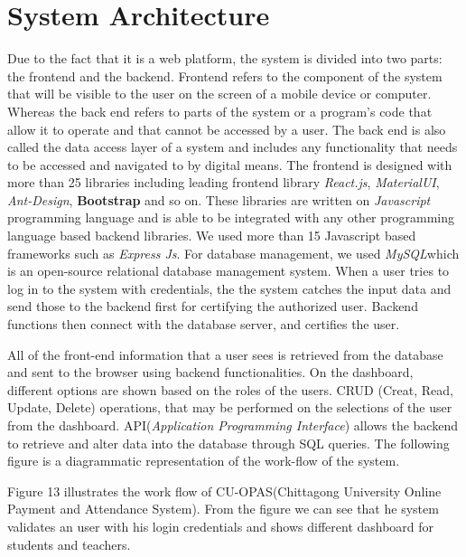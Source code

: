 \section{System Architecture}\label{sec:sa}
Due to the fact that it is a web platform, the system is divided into two parts: the frontend and the backend. Frontend refers to the component of the system that will be visible to the user on the screen of a mobile device or computer. Whereas the back end refers to parts of the system or a program's code that allow it to operate and that cannot be accessed by a user. The back end is also called the data access layer of a system and includes any functionality that needs to be accessed and navigated to by digital means. The frontend is designed with more than 25 libraries including leading frontend library \textit{React.js}, \textit{MaterialUI}, \textit{Ant-Design}, \textbf{Bootstrap} and so on. These libraries are written on \textit{Javascript} programming language and is able to be integrated with any other programming language based backend libraries. We used more than 15 Javascript based frameworks such as \textit{Express Js}. For database management, we used \textit{MySQL}\footnotemark which is an open-source relational database management system. When a user tries to log in to the system with credentials, the the system catches the input data and send those to the backend first for certifying the authorized user. Backend functions then connect with the database server, and certifies the user.

All of the front-end information that a user sees is retrieved from the database and sent to the browser using backend functionalities. On the dashboard, different options are shown based on the roles of the users. CRUD (Creat, Read, Update, Delete) operations, that may be performed on the selections of the user from the dashboard. API\footnotemark (\textit{Application Programming Interface}) allows the backend to retrieve and alter data into the database through SQL queries. The following figure is a diagrammatic representation of the work-flow of the system.

Figure 13 illustrates the work flow of CU-OPAS(Chittagong University Online Payment and Attendance System). From the figure we can see that he system validates an user with his login credentials and shows different dashboard for students and teachers.



